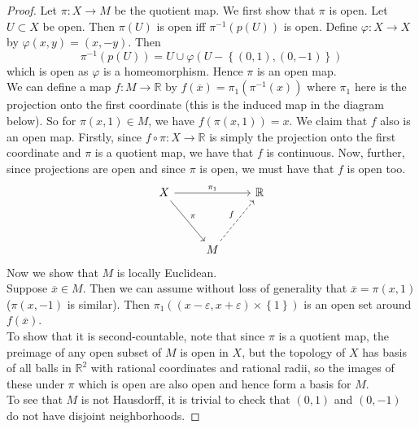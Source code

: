 \documentclass[reqno]{amsart}
\theoremstyle{plain}%
\theoremstyle{definition}
\theoremstyle{remark}
\begin{document}
    \begin{proof}
        Let $\pi  \colon X \to M$ be the quotient map.
        We first show that $\pi$ is open.
        Let $U \subset X$ be open. Then
        $\pi(U)$ is open iff $\pi^{-1}\left( p
        \left( U \right) \right) $ is open. Define
        $\varphi  \colon X \to X$ by
        $\varphi(x,y) = (x,-y)$. Then
         \[
        \pi^{-1}\left( p(U) \right) 
        = U \cup \varphi \left( U - \left\{ 
        (0,1) , (0,-1) \right\}  \right) 
        \] 
        which is open as $\varphi$ is a homeomorphism. 
        Hence $\pi$ is an open map.\\
        We can define a map $f  \colon
        M \to \mathbb{R}$ by
        $f (\overline{x}) = \pi_1 \left( \pi^{-1}(x) \right) $ where
        $\pi_1$ here is the projection onto the first coordinate (this
        is the induced map in the diagram below).
        So for $\pi (x,1) \in M$, we have
        $f\left( \pi (x,1) \right) = x$.
        We claim that $f$ also is an open map. Firstly, since
        $f \circ \pi  \colon X \to \mathbb{R}$ is simply the projection
        onto the first coordinate and $\pi$ is a quotient map,
        we have that $f$ is continuous. Now, further, since
        projections are open and since $\pi$ is open, we must have
        that $f$ is open too.
        \begin{equation*}
        \begin{tikzcd}
            X \ar[rr, "\pi_1"] \ar[ddr, "\pi"] && \mathbb{R}\\
                                     &&\\
                                     &M \ar[uur, "f", dashed]&
        \end{tikzcd}
        \end{equation*}
        Now we show that $M$ is locally Euclidean.\\
        Suppose $\overline{x}\in M$. Then we can assume without loss of
        generality that  $\overline{x}= \pi \left( x,1 \right) $ 
        ($\pi\left( x,-1 \right) $ is similar).
        Then $\pi_1 \left( \left( x-\varepsilon, x+\varepsilon \right) 
        \times  \left\{ 1 \right\} \right) $ is an open set
        around $f\left( \overline{x} \right) $.\\
        To show that it is second-countable, 
        note that since $\pi$ is a quotient map, the preimage of any
        open subset of $M$ is open in $X$, but the topology
        of $X$ has basis of all balls in
        $\mathbb{R}^2$ with rational coordinates and rational radii, so
        the images of these under $\pi$ which is open are also open
        and hence form a basis for $M$.\\
        To see that $M$ is not Hausdorff, it is trivial to check that
        $\left( 0,1 \right) $ and $(0,-1)$ do not have
        disjoint neighborhoods.
    \end{proof}
\end{document}
